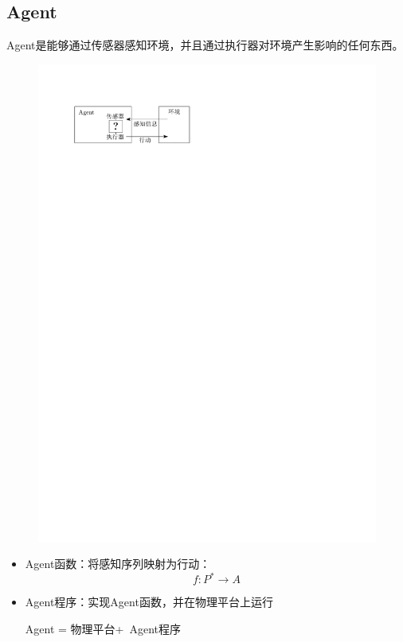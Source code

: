 \subsection{Agent}
Agent是能够通过传感器感知环境，并且通过执行器对环境产生影响的任何东西。
\begin{figure}[htbp]
    \centering
    \includegraphics{image/Agent.pdf}
\end{figure}

\begin{itemize}
    \item Agent函数：将感知序列映射为行动：
    \[
        f:P^*\to A
    \]
    \item Agent程序：实现Agent函数，并在物理平台上运行
    \begin{center}
        \colorbox{main1}{Agent = 物理平台+\ Agent程序}
    \end{center}
\end{itemize}

